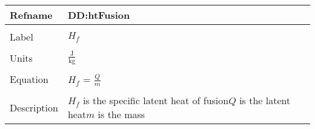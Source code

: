 \documentclass[12pt]{article}
\begin{document}
~\newline
\noindent \begin{minipage}{\textwidth}
\begin{tabular}{p{} p{}}
\toprule \textbf{Refname} & \textbf{DD:htFusion}
\label{DD:htFusion}
\\ \midrule \\
Label & $H_{f}$
\\ \midrule \\
Units & $\frac{\text{J}}{\text{kg}}$
\\ \midrule \\
Equation & $H_{f}$ = $\frac{Q}{m}$
\\ \midrule \\
Description & $H_{f}$ is the specific latent heat of fusion\newline$Q$ is the latent heat\newline$m$ is the mass
\\ \bottomrule \end{tabular}
\end{minipage}\\
\end{document}
